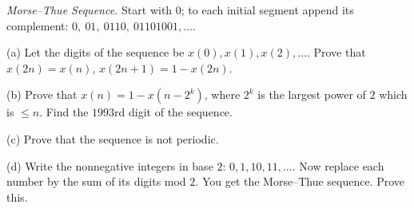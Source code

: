 \emph{Morse–Thue Sequence.} Start with $0$; to each initial segment append its complement: $0,\ 01,\ 0110,\ 01101001, \ldots$.

(a) Let the digits of the sequence be $x(0), x(1), x(2), \ldots$. Prove that $x(2n) = x(n)$, $x(2n+1) = 1 - x(2n)$.

(b) Prove that $x(n) = 1 - x(n - 2^k)$, where $2^k$ is the largest power of $2$ which is $\leq n$. Find the $1993$rd digit of the sequence.

(c) Prove that the sequence is not periodic.

(d) Write the nonnegative integers in base $2$: $0, 1, 10, 11, \ldots$. Now replace each number by the sum of its digits mod $2$. You get the Morse–Thue sequence. Prove this.
